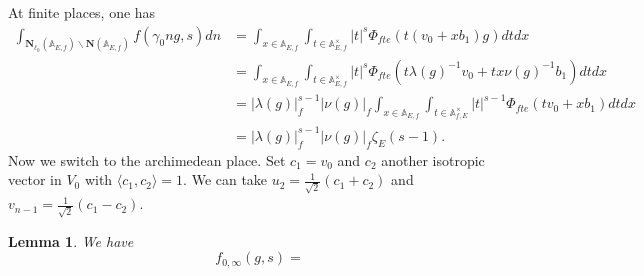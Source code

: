 \documentclass[12pt]{article}
\newtheorem{lemma}[thm]{Lemma}
\theoremstyle{remark}
\theoremstyle{definition}
\newcommand{\A}{\mathbb{A}}
\newcommand{\lrangle}[2]{\langle #1,#2\rangle}
\newcommand{\bff}[1]{\mathbf{#1}}
\begin{document}
At finite places, one has 
   \begin{align*}
       \int_{\bff{N}_{\ell_{0}}(\A_{E,f})\backslash\bff{N}(\A_{E,f})}f(\gamma_{0}ng,s)dn&=\int_{x\in\A_{E,f}}\int_{t\in\A_{E,f}^{\times}}|t|^{s}\Phi_{fte}(t(v_{0}+xb_{1})g)dtdx\\
       &=\int_{x\in\A_{E,f}}\int_{t\in\A_{E,f}^{\times}}|t|^{s}\Phi_{fte}(t\lambda(g)^{-1}v_{0}+tx\nu(g)^{-1}b_{1})dtdx\\
       &=|\lambda(g)|_{f}^{s-1}|\nu(g)|_{f}\int_{x\in\A_{E,f}}\int_{t\in\A_{f,E}^{\times}}|t|^{s-1}\Phi_{fte}(tv_{0}+xb_{1})dtdx\\
       &=|\lambda(g)|_{f}^{s-1}|\nu(g)|_{f}\zeta_{E}(s-1).
   \end{align*}
   Now we switch to the archimedean place.
   Set $c_{1}=v_{0}$ and $c_{2}$ another isotropic vector in $V_{0}$ with $\lrangle{c_{1}}{c_{2}}=1$.
   We can take $u_{2}=\frac{1}{\sqrt{2}}(c_{1}+c_{2})$ and $v_{n-1}=\frac{1}{\sqrt{2}}(c_{1}-c_{2})$.
   \begin{lemma}
    We have 
    \[f_{0,\infty}(g,s)=\]
   \end{lemma}
\end{document}
